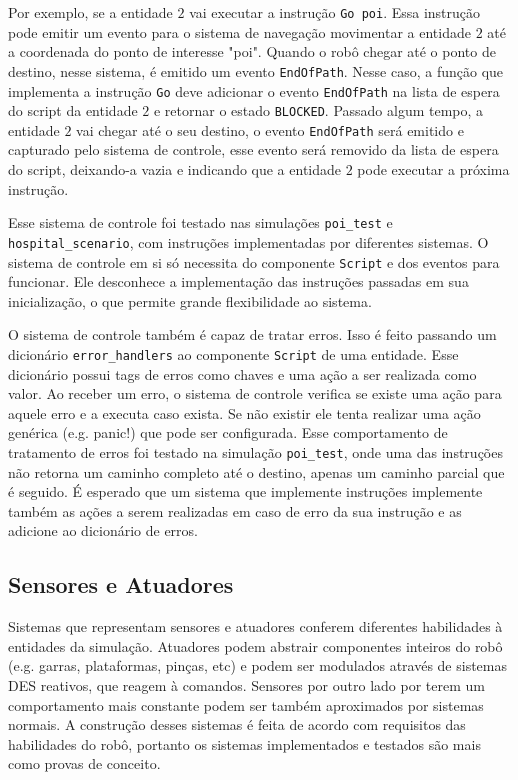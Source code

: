 Por exemplo, se a entidade $2$ vai executar a instrução \texttt{Go poi}. Essa instrução pode emitir um evento para o sistema de navegação movimentar a entidade $2$ até a coordenada do ponto de interesse "poi". Quando o robô chegar até o ponto de destino, nesse sistema, é emitido um evento \texttt{EndOfPath}. Nesse caso, a função que implementa a instrução \texttt{Go} deve adicionar o evento \texttt{EndOfPath} na lista de espera do script da entidade $2$ e retornar o estado \texttt{BLOCKED}. Passado algum tempo, a entidade $2$ vai chegar até o seu destino, o evento \texttt{EndOfPath} será emitido e capturado pelo sistema de controle, esse evento será removido da lista de espera do script, deixando-a vazia e indicando que a entidade $2$ pode executar a próxima instrução.

Esse sistema de controle foi testado nas simulações \texttt{poi\_test} e \texttt{hospital\_scenario}, com instruções implementadas por diferentes sistemas. O sistema de controle em si só necessita do componente \texttt{Script} e dos eventos para funcionar. Ele desconhece a implementação das instruções passadas em sua inicialização, o que permite grande flexibilidade ao sistema.

O sistema de controle também é capaz de tratar erros. Isso é feito passando um dicionário \texttt{error\_handlers} ao componente \texttt{Script} de uma entidade. Esse dicionário possui tags de erros como chaves e uma ação a ser realizada como valor. Ao receber um erro, o sistema de controle verifica se existe uma ação para aquele erro e a executa caso exista. Se não existir ele tenta realizar uma ação genérica (e.g. panic!) que pode ser configurada. Esse comportamento de tratamento de erros foi testado na simulação \texttt{poi\_test}, onde uma das instruções não retorna um caminho completo até o destino, apenas um caminho parcial que é seguido. É esperado que um sistema que implemente instruções implemente também as ações a serem realizadas em caso de erro da sua instrução e as adicione ao dicionário de erros.

\subsection{Sensores e Atuadores}
\label{sec:robot_skills}

Sistemas que representam sensores e atuadores conferem diferentes habilidades à entidades da simulação. Atuadores podem abstrair componentes inteiros do robô (e.g. garras, plataformas, pinças, etc) e podem ser modulados através de sistemas DES reativos, que reagem à comandos. Sensores por outro lado por terem um comportamento mais constante podem ser também aproximados por sistemas normais. A construção desses sistemas é feita de acordo com requisitos das habilidades do robô, portanto os sistemas implementados e testados são mais como provas de conceito.

